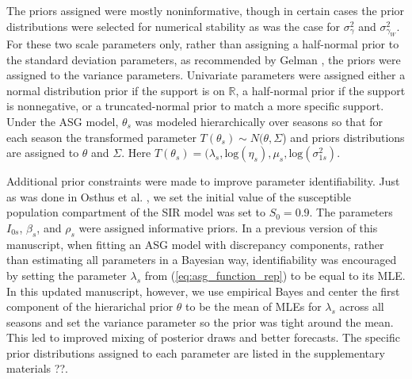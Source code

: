The priors assigned were mostly noninformative, though in certain cases the 
prior distributions were selected for numerical stability as was the case 
for $\sigma_{\gamma}^2$ and $\sigma_{\gamma_W}^2$. For these two scale 
parameters only, rather than assigning a half-normal prior to the standard 
deviation parameters, as recommended by Gelman \cite[]{gelman2006prior}, the 
priors were assigned to the variance parameters. Univariate parameters were 
assigned either a normal distribution prior if the support is on $\mathbb{R}$, 
a half-normal prior if the support is nonnegative, or a truncated-normal 
prior to match a more specific support. Under the ASG model, $\theta_s$ was 
modeled hierarchically over seasons so that for each season the transformed 
parameter $T(\theta_s) \sim N(\theta, \Sigma$) and priors distributions are 
assigned to $\theta$ and $\Sigma$. Here 
$T(\theta_s) = (\lambda_s, \text{log}(\eta_s), \mu_s, \text{log}(\sigma_{1s}^2)$.



 
Additional prior constraints were made to improve parameter identifiability. 
Just as was done in Osthus et al. \cite[]{osthus2019dynamic},
we set the initial value of the 
susceptible population compartment of the SIR model was set to $S_0 = 0.9$. 
The parameters $I_{0s}$, $\beta_s$, and $\rho_s$ were assigned informative 
priors. In a previous version of this manuscript, when fitting an ASG model
with discrepancy components,
rather than estimating all parameters in a Bayesian way,
identifiability was encouraged by setting
the parameter $\lambda_s$ from (\ref{eq:asg_function_rep})
to be equal to its MLE. In this updated manuscript, 
however, we use empirical Bayes and center the first component of the 
hierarichal prior $\theta$ to be the mean of MLEs for $\lambda_s$ across
all seasons and set the variance parameter so the prior was tight around the
mean. This led to improved mixing of posterior draws and better forecasts.
The 
specific prior distributions assigned to each parameter are listed in the 
supplementary materials ??.




